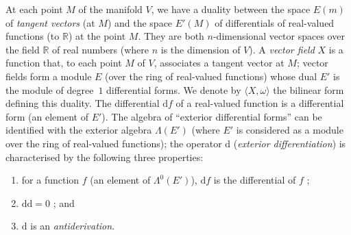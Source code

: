 \documentclass{article}
\newcommand{\dd}{\mathrm{d}}
\newcommand{\RR}{\mathbb{R}}
\newcommand{\oldpage}[1]{\marginpar{\footnotesize$\Big\vert$ \textit{p.~#1}}}
\begin{document}
\oldpage{9}
At each point $M$ of the manifold $V$, we have a duality between the space $E(m)$ of \emph{tangent vectors} (at $M$) and the space $E'(M)$ of differentials of real-valued functions (to $\RR$) at the point $M$.
They are both $n$-dimensional vector spaces over the field $\RR$ of real numbers (where $n$ is the dimension of $V$).
A \emph{vector field} $X$ is a function that, to each point $M$ of $V$, associates a tangent vector at $M$;
vector fields form a module $E$ (over the ring of real-valued functions) whose dual $E'$ is the module of degree~$1$ differential forms.
We denote by $\langle X,\omega\rangle$ the bilinear form defining this duality.
The differential $\dd f$ of a real-valued function is a differential form (an element of $E'$).
The algebra of ``exterior differential forms'' can be identified with the exterior algebra $\Lambda(E')$ (where $E'$ is considered as a module over the ring of real-valued functions);
the operator $\dd$ (\emph{exterior differentiation}) is characterised by the following three properties:
\begin{enumerate}[1)]
  \item for a function $f$ (an element of $\Lambda^0(E')$), $\dd f$ is the differential of $f$ ;
  \item $\dd\dd=0$ ; and
  \item $\dd$ is an \emph{antiderivation}.
\end{enumerate}
\end{document}
